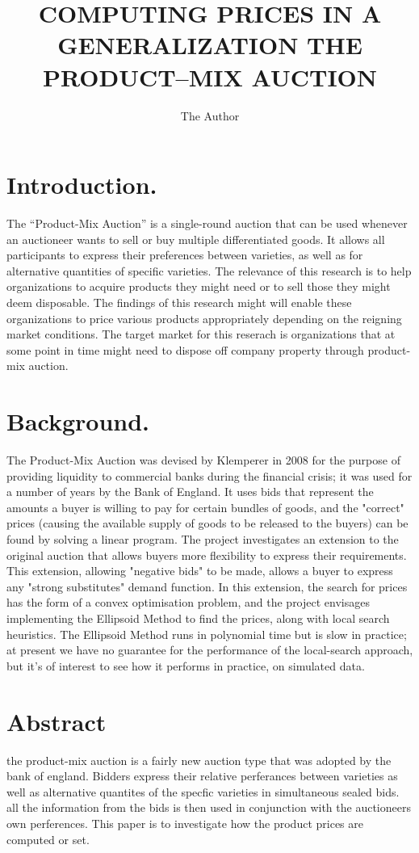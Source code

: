 \documentclass[11pt]{article} %
\title{COMPUTING PRICES IN A GENERALIZATION THE PRODUCT–MIX AUCTION}
\author{The Author}
\begin{document}
\maketitle

\section{Introduction.}

The “Product-Mix Auction” is a single-round auction that can be used whenever an auctioneer wants to sell or buy multiple differentiated goods. It allows all participants to express their preferences between varieties, as well as for alternative quantities of specific varieties.
The relevance of this research is to help organizations to acquire products they might need or to sell those they might deem disposable. The findings of this research might will enable these organizations to price various products appropriately depending on the reigning market conditions. The target market for this reserach is organizations that at some point in time might need to dispose off company property through product-mix auction.

\section{Background.}
The Product-Mix Auction was devised by Klemperer in 2008 for the purpose of providing liquidity to commercial banks during the financial crisis; it was used for a number of years by the Bank of England.
It uses bids that represent the amounts a buyer is willing to pay for certain bundles of goods, and the "correct" prices (causing the available supply of goods to be released to the buyers) can be found by solving a linear program. The project investigates an extension to the original auction that allows buyers more flexibility to express their requirements. 
This extension, allowing "negative bids" to be made, allows a buyer to express any "strong substitutes" demand function. In this extension, the search for prices has the form of a convex optimisation problem, and the project envisages implementing the Ellipsoid Method to find the prices, along with local search heuristics. The Ellipsoid Method runs in polynomial time but is slow in practice; at present we have no guarantee for the performance of the local-search approach, but it's of interest to see how it performs in practice, on simulated data.

\section{Abstract}
the product-mix auction is a fairly new auction type that was adopted by the bank of england. 
Bidders express their relative perferances between varieties as well as alternative quantites of the specfic varieties in simultaneous sealed bids.
 all the information from the bids is then used in conjunction with the auctioneers own perferences. This paper is to investigate how the product prices are computed or set.
\end{document}
